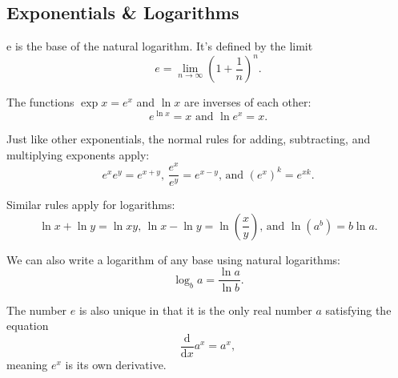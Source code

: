 \subsection{Exponentials \& Logarithms}
\begin{definition}
	e is the base of the natural logarithm. It's defined by the limit
	\begin{equation*}
		e = \lim\limits_{n\rightarrow\infty}{\left(1+\frac{1}{n}\right)^n}.
	\end{equation*}
\end{definition}

The functions $\exp{x} = e^x$ and $\ln{x}$ are inverses of each other:
\begin{equation*}
	e^{\ln{x}} = x \text{ and } \ln{e^x} = x.
\end{equation*}

Just like other exponentials, the normal rules for adding, subtracting, and multiplying exponents apply:
\begin{equation*}
	e^xe^y = e^{x+y} \text{, } \frac{e^x}{e^y}=e^{x-y} \text{, and } \left(e^x\right)^k=e^{xk}.
\end{equation*}

Similar rules apply for logarithms:
\begin{equation*}
	\ln{x}+\ln{y} = \ln{xy} \text{, } \ln{x}-\ln{y} = \ln{\left(\frac{x}{y}\right)} \text{, and } \ln{\left(a^b\right)} = b\ln{a}.
\end{equation*}

We can also write a logarithm of any base using natural logarithms:
\begin{equation*}
	\log_{b}{a} = \frac{\ln{a}}{\ln{b}}.
\end{equation*}

The number $e$ is also unique in that it is the only real number $a$ satisfying the equation
\begin{equation*}
	\frac{\mathrm{d}}{\mathrm{d}x}a^x = a^x,
\end{equation*}
meaning $e^x$ is its own derivative.